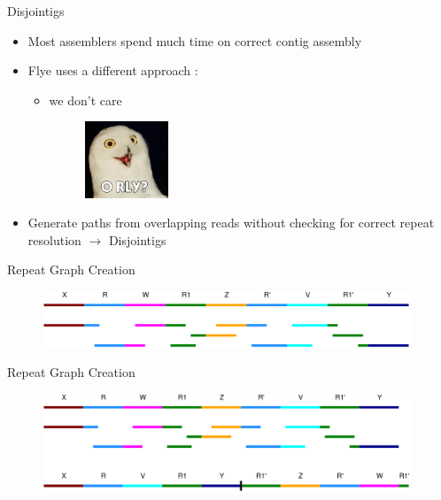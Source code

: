 \documentclass{beamer}
\begin{document}
  \begin{frame}{Disjointigs}
    \begin{itemize}[<+- | alert@+>]
      \item Most assemblers spend much time on correct contig assembly

      \item Flye uses a different approach \cite{kolmogorov_assembly_2019}:
      
      \begin{itemize}[<+- | alert@+>]
        \item we don't care 
        \begin{figure}
          \includegraphics[width=2.5cm]{presentation/images/orly-owl.jpg}
          \label{fig:orly}
        \end{figure}
        
      \end{itemize}

      \item Generate paths from overlapping reads without checking for correct repeat resolution $\rightarrow$ Disjointigs
    \end{itemize}
  \end{frame}

  \begin{frame}{Repeat Graph Creation}
    \begin{figure}
      \includegraphics[width=11cm]{presentation/images/genome_and_reads.png}
      \label{fig:genome_and_reads}
    \end{figure}
  \end{frame}

  \begin{frame}{Repeat Graph Creation}
    \begin{figure}
      \includegraphics[width=11cm]{presentation/images/disjointigs.png}
      \label{fig:disjointigs}
    \end{figure}
  \end{frame}
\end{document}
